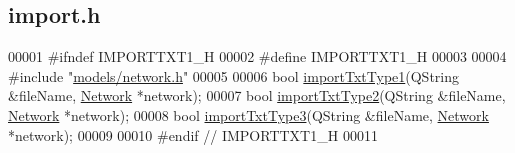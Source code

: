\hypertarget{import_8h_source}{}\subsection{import.\+h}
\label{import_8h_source}

\begin{DoxyCode}
00001 \textcolor{preprocessor}{#ifndef IMPORTTXT1\_H}
00002 \textcolor{preprocessor}{#define IMPORTTXT1\_H}
00003 
00004 \textcolor{preprocessor}{#include "\hyperlink{network_8h}{models/network.h}"}
00005 
00006 \textcolor{keywordtype}{bool} \hyperlink{import_8h_ab30ac380d5e14f830ebc8eb839fbbdf0}{importTxtType1}(QString &fileName, \hyperlink{class_network}{Network} *network);
00007 \textcolor{keywordtype}{bool} \hyperlink{import_8h_aef466de21b145a0fdf215dd1a6409924}{importTxtType2}(QString &fileName, \hyperlink{class_network}{Network} *network);
00008 \textcolor{keywordtype}{bool} \hyperlink{import_8h_acd1a54d4b2a28043b1489f0be7423ecd}{importTxtType3}(QString &fileName, \hyperlink{class_network}{Network} *network);
00009 
00010 \textcolor{preprocessor}{#endif // IMPORTTXT1\_H}
00011 
\end{DoxyCode}

